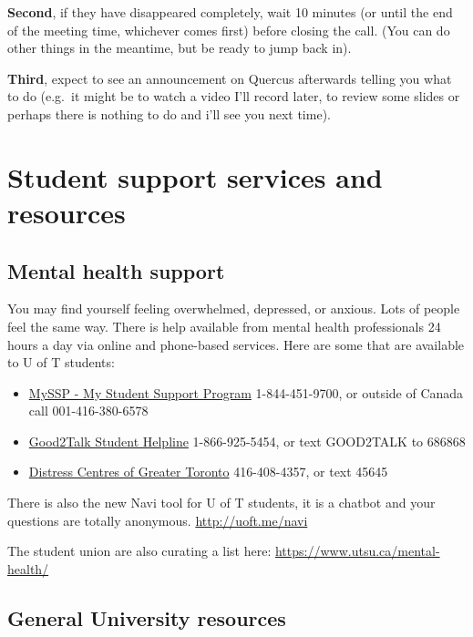 \documentclass[
  openany]{book}
\begin{document}
\textbf{Second}, if they have disappeared completely, wait 10 minutes (or until the end of the meeting time, whichever comes first) before closing the call. (You can do other things in the meantime, but be ready to jump back in).

\textbf{Third}, expect to see an announcement on Quercus afterwards telling you what to do (e.g.~it might be to watch a video I'll record later, to review some slides or perhaps there is nothing to do and i'll see you next time).

\hypertarget{student-support-services-and-resources}{%
\section{Student support services and resources}\label{student-support-services-and-resources}}

\hypertarget{mental-health-support}{%
\subsection{Mental health support}\label{mental-health-support}}

You may find yourself feeling overwhelmed, depressed, or anxious. Lots of people feel the same way. There is help available from mental health professionals 24 hours a day via online and phone-based services. Here are some that are available to U of T students:

\begin{itemize}
\item
  \href{https://www.studentlife.utoronto.ca/hwc/myssp}{MySSP - My Student Support Program} 1-844-451-9700, or outside of Canada call 001-416-380-6578
\item
  \href{https://good2talk.ca/}{Good2Talk Student Helpline} 1-866-925-5454, or text GOOD2TALK to 686868
\item
  \href{https://www.torontodistresscentre.com/}{Distress Centres of Greater Toronto} 416-408-4357, or text 45645
\end{itemize}

There is also the new Navi tool for U of T students, it is a chatbot and your questions are totally anonymous. \url{http://uoft.me/navi}

The student union are also curating a list here: \url{https://www.utsu.ca/mental-health/}

\hypertarget{general-university-resources}{%
\subsection{General University resources}\label{general-university-resources}}
\end{document}
